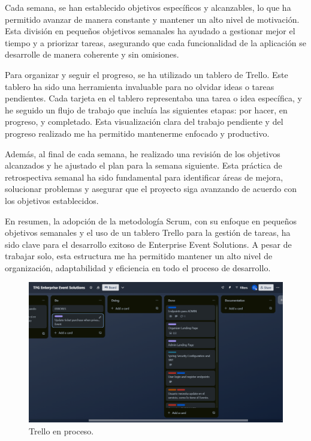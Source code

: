 Cada semana, se han establecido objetivos específicos y alcanzables, lo que ha permitido avanzar de manera constante y mantener un alto nivel 
de motivación. Esta división en pequeños objetivos semanales ha ayudado a gestionar mejor el tiempo y a priorizar tareas, asegurando que cada 
funcionalidad de la aplicación se desarrolle de manera coherente y sin omisiones.

Para organizar y seguir el progreso, se ha utilizado un tablero de Trello. Este tablero ha sido una herramienta invaluable para no olvidar ideas o 
tareas pendientes. Cada tarjeta en el tablero representaba una tarea o idea específica, y he seguido un flujo de trabajo que incluía las siguientes 
etapas: por hacer, en progreso, y completado. Esta visualización clara del trabajo pendiente y del progreso realizado me ha permitido mantenerme 
enfocado y productivo.

Además, al final de cada semana, he realizado una revisión de los objetivos alcanzados y he ajustado el plan para la semana siguiente. Esta práctica 
de retrospectiva semanal ha sido fundamental para identificar áreas de mejora, solucionar problemas y asegurar que el proyecto siga avanzando de acuerdo 
con los objetivos establecidos.

En resumen, la adopción de la metodología Scrum, con su enfoque en pequeños objetivos semanales y el uso de un tablero Trello para la gestión de 
tareas, ha sido clave para el desarrollo exitoso de Enterprise Event Solutions. A pesar de trabajar solo, esta estructura me ha permitido mantener 
un alto nivel de organización, adaptabilidad y eficiencia en todo el proceso de desarrollo.


\begin{figure}[h]
    \includegraphics[width=\linewidth]{Trello.png}
    \caption{Trello en proceso.}
    \label{fig:metodologias1}
\end{figure}

